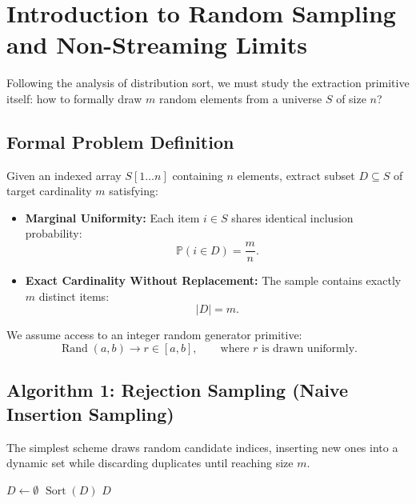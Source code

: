 \FloatBarrier
\section{Introduction to Random Sampling and Non-Streaming Limits}
\label{sec:intro-random-sampling-non-streaming}

Following the analysis of distribution sort, we must study the extraction primitive itself: how to formally draw $m$ random elements from a universe $S$ of size $n$?

\subsection{Formal Problem Definition}
Given an indexed array $S[1 \dots n]$ containing $n$ elements, extract subset $D \subseteq S$ of target cardinality $m$ satisfying:
\begin{itemize}
  \item \textbf{Marginal Uniformity:} Each item $i \in S$ shares identical inclusion probability:
  \begin{equation}
    \mathbb{P}(i \in D) = \frac{m}{n}.
  \end{equation}
  \item \textbf{Exact Cardinality Without Replacement:} The sample contains exactly $m$ distinct items:
  \begin{equation}
    |D| = m.
  \end{equation}
\end{itemize}

We assume access to an integer random generator primitive:
\begin{equation}
  \operatorname{Rand}(a, b) \to r \in [a, b], \qquad \text{where } r \text{ is drawn uniformly.}
\end{equation}

\subsection{Algorithm 1: Rejection Sampling (Naive Insertion Sampling)}
The simplest scheme draws random candidate indices, inserting new ones into a dynamic set while discarding duplicates until reaching size $m$.

\begin{algorithm}[H]
  \caption{Rejection Sampling via Dynamic Set Insertion}
  \label{alg:rejection-sampling}
  $D \leftarrow \emptyset$\;
  $\operatorname{Sort}(D)$\;
  \Return $D$\;
\end{algorithm}

